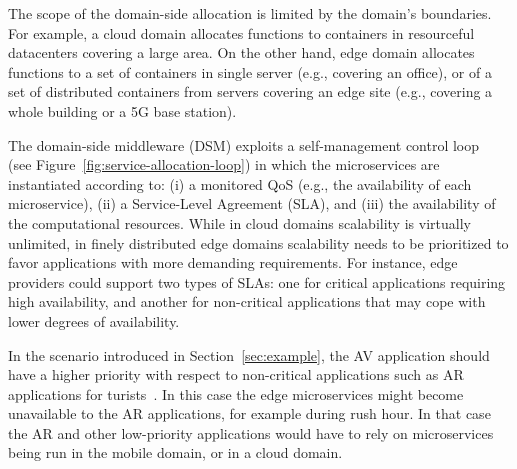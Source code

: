 The scope of the domain-side allocation is limited by the domain's boundaries. For example, a cloud domain allocates functions to containers in resourceful datacenters covering a large area. On the other hand, edge domain allocates functions to a set of containers in single server (e.g., covering an office), or of a set of distributed containers from servers covering an edge site (e.g., covering a whole building or a 5G base station).



The domain-side middleware (DSM) exploits a self-management control loop~\cite{kephart2003vision} (see Figure~\ref{fig:service-allocation-loop}) in which the microservices are instantiated according to: (i) a monitored QoS (e.g., the availability of each microservice), (ii) a Service-Level Agreement (SLA), and (iii) the availability of the computational resources. 
While in cloud domains scalability is virtually unlimited, in finely distributed edge domains scalability needs to be prioritized to favor applications with more demanding requirements. For instance, edge providers could support two types of SLAs: one for critical applications requiring high availability, and another for non-critical applications that may cope with lower degrees of availability.  

In the scenario introduced in Section~\ref{sec:example}, the AV application should have a higher priority with respect to non-critical applications such as AR applications for turists~\cite{GarrigaMendonca2017}. In this case the edge microservices might become unavailable to the AR applications, for example during rush hour. In that case the AR and other low-priority applications would have to rely on microservices being run in the mobile domain, or in a cloud domain.

